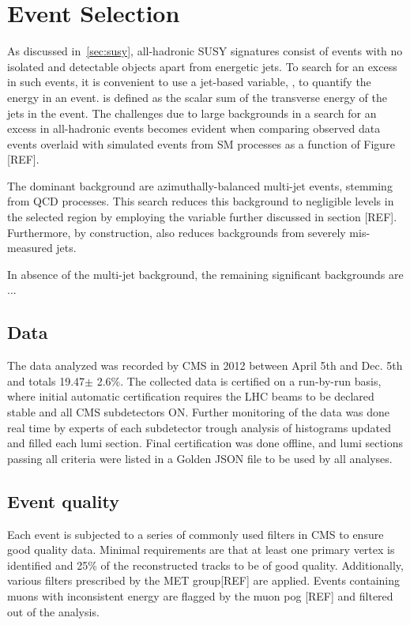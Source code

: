 \clearpage
\section{Event Selection\label{sec:eventSelection}}

As discussed in~\ref{sec:susy}, all-hadronic SUSY signatures consist of events with
no isolated and detectable objects apart from energetic jets. To search
for an excess in such events, it is convenient to use a jet-based variable,
\scalht, to quantify the energy in an event.  \scalht is defined as the scalar
sum of the transverse energy of the jets in the event. The challenges due to large
backgrounds in a search for an excess in all-hadronic events becomes evident 
when comparing observed data events overlaid with simulated events from 
SM processes as a function of \scalht Figure [REF].
 
The dominant background are azimuthally-balanced multi-jet events, stemming from QCD
processes. This search reduces this background to negligible levels in the
selected region by employing the \alphat variable further discussed in section [REF].
Furthermore, by construction, \alphat also reduces backgrounds from severely mis-measured
jets. 

In absence of the multi-jet background, the remaining significant backgrounds are ...

\subsection{Data}
The data analyzed was recorded by CMS in 2012 between April 5th and Dec. 5th and
totals 19.47$\pm$ 2.6\%. The collected data is certified on a run-by-run 
basis, where initial automatic certification requires the LHC beams to be declared
stable and all CMS subdetectors ON. Further monitoring of the data was done real time
by experts of each subdetector trough analysis of histograms updated and filled
each lumi section. Final certification was done offline, and lumi sections passing
all criteria were listed in a Golden JSON file to be used by all analyses. 

\subsection{Event quality}

Each event is subjected to a series of commonly used filters in CMS to ensure good
quality data. Minimal requirements are that at least one primary vertex is identified 
and 25\% of the reconstructed tracks to be of good quality. Additionally, various filters 
prescribed by the MET group[REF] are applied. Events containing muons with inconsistent
energy are flagged by the muon pog [REF] and filtered out of the analysis. 

